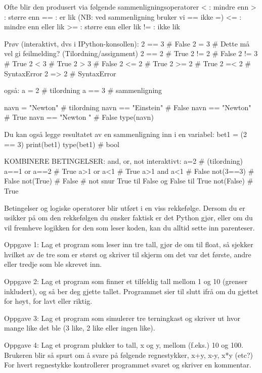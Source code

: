 Ofte blir den produsert via følgende sammenligningsoperatorer 
 <  : mindre enn
 >  : større enn
 == : er lik  (NB: ved sammenligning bruker vi == ikke =)
 <= : mindre enn eller lik
 >= : større enn eller lik 
 != : ikke lik


Prøv (interaktivt, dvs i IPython-konsollen): 
2 == 3   # False
2 = 3    # Dette må vel gi feilmelding? (Tilordning/assignment)
2 == 2   # True
2 != 2   # False
2 != 3   # True
2 < 3    # True
2 > 3    # False
2 <= 2   # True
2 >= 2   # True
2 =< 2   # SyntaxError
2 => 2   # SyntaxError

også:
a = 2    # tilordning
a == 3   # sammenligning

navn = "Newton"       # tilordning
navn == "Einstein"    # False 
navn == "Newton"      # True
navn == "Newton "     # False
type(navn)

Du kan også legge resultatet av en sammenligning inn i en variabel:
bet1 = (2 == 3)   
print(bet1)
type(bet1)   # bool


KOMBINERE BETINGELSER: and, or, not 
interaktivt: 
a=2             # (tilordning)
a==1 or a==2    # True 
a>1  or  a<1    # True 
a>1  and a<1    # False
not(3==3)       # False
not(True)       # False  # not snur True til False og False til True
not(False)      # True 



Betingelser og logiske operatorer blir utført i en viss rekkefølge.
Dersom du er usikker på om den rekkefølgen du ønsker faktisk er det Python gjør,
eller om du vil fremheve logikken for den som leser koden, 
kan du alltid sette inn parenteser.



Oppgave 1: Lag et program som leser inn tre tall, gjør de om til float, 
så sjekker hvilket av de tre som er størst og skriver til skjerm om
det var det første, andre eller tredje som ble skrevet inn. 


Oppgave 2: Lag et program som finner et tilfeldig tall mellom 1 og 10
(grenser inkludert), og så ber deg gjette tallet.
Programmet sier til slutt ifrå om du gjettet for høyt, for lavt eller riktig. 


Oppgave 3: Lag et program som simulerer tre terningkast og skriver ut hvor mange
like det ble (3 like, 2 like eller ingen like). 


Oppgave 4: Lag et program plukker to tall, x og y, mellom (f.eks.) 10 og 100. 
Brukeren blir så spurt om å svare på følgende regnestykker, x+y, x-y, x*y (etc?) 
For hvert regnestykke kontrollerer programmet svaret og skriver en kommentar. 

